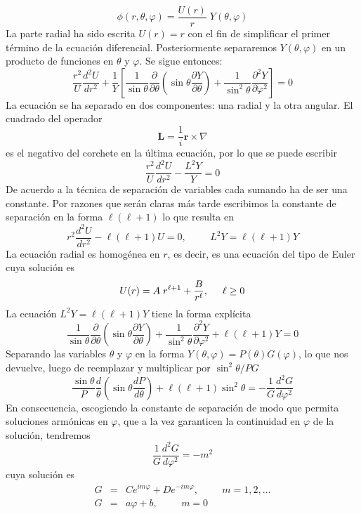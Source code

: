 \[ \phi(r, \theta, \varphi) = \dfrac{U(r)}{r} \; Y(\theta, \varphi) \]
La parte radial ha sido escrita $U(r) = r$ con el fin de simplificar el primer término de la ecuación diferencial. Posteriormente separaremos $Y(\theta, \varphi)$ en un producto de funciones en $\theta$ y $\varphi$. Se sigue entonces:
\[ \dfrac{r^{2}}{U} \dfrac{d^{2} U}{d r^{2}} + \dfrac{1}{Y} \left[ \dfrac{1}{\sin \theta} \dfrac{\partial}{\partial \theta} \left( \sin \theta \dfrac{\partial Y}{\partial \theta} \right) + \dfrac{1}{\sin^{2} \theta} \dfrac{\partial^{2} Y}{\partial \varphi^{2}} \right] = 0\]
La ecuación se ha separado en dos componentes: una radial y la otra angular.
El cuadrado del operador
\[ \mathbf{L} = \dfrac{1}{i} \mathbf{r} \times \nabla \]
es el negativo del corchete en la última ecuación, por lo que se puede escribir
\[ \dfrac{r^{2}}{U} \dfrac{d^{2} U}{d r^{2}} -  \dfrac{L^{2} Y}{Y} = 0 \]
De acuerdo a la técnica de separación de variables cada sumando ha de ser una constante. Por razones que serán claras más tarde escribimos la constante de separación en la forma $\ell (\ell + 1)$ lo que resulta en
\[ r^{2} \dfrac{d^{2} U}{d r^{2}} - \ell (\ell + 1) U = 0, \hspace{1cm} L^{2} Y = \ell (\ell + 1) Y \]
La ecuación radial es homogénea en $r$, es decir, es  una ecuación del tipo de Euler cuya solución es
\[ U(r) = A \; r^{\ell + 1} + \dfrac{B}{r^{\ell}}, \hspace{0.5cm} \ell \geq 0 \]
La ecuación $L^{2} Y = \ell (\ell + 1) Y$ tiene la forma explícita
\[ \dfrac{1}{\sin \theta} \dfrac{\partial}{\partial \theta} \left( \sin \theta \dfrac{\partial Y}{\partial \theta}  \right) + \dfrac{1}{\sin^{2} \theta} \dfrac{\partial^{2} Y}{\partial \varphi^{2}} + \ell (\ell + 1) Y = 0 \]
Separando las variables $\theta$ y $\varphi$ en la forma $Y(\theta, \varphi) = P(\theta) G(\varphi)$, lo que nos devuelve, luego de reemplazar y multiplicar por $\sin^{2} \theta / PG$
\[ \dfrac{\sin \theta}{P} \dfrac{d}{\theta} \left( \sin \theta \dfrac{d P}{d \theta} \right) + \ell (\ell + 1) \sin^{2} \theta = - \dfrac{1}{G} \dfrac{d^{2} G}{d \varphi^{2}} \]
En consecuencia, escogiendo la constante de separación de modo que permita soluciones armónicas en $\varphi$, que a la vez garanticen la continuidad en $\varphi$ de la solución, tendremos
\[ \dfrac{1}{G} \dfrac{d^{2} G}{d \varphi^{2}} = - m^{2} \]
cuya solución es
\begin{eqnarray}
G &=& C e^{i m \varphi} + D e^{-i m \varphi}, \hspace{1cm} m = 1, 2, \ldots \nonumber \\
G &=& a \varphi + b, \hspace{1cm} m = 0 \nonumber
\end{eqnarray}
